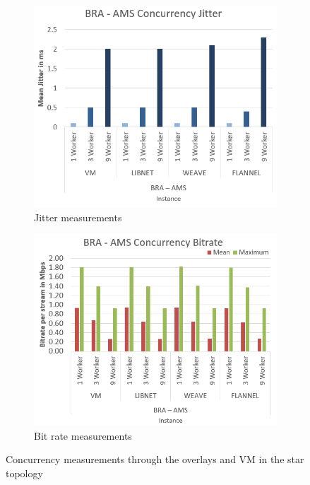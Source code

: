 \begin{figure}[!ht]
\centering
\begin{subfigure}{.5\textwidth}
  \centering
  \includegraphics[scale=0.5]{img/All_Streaming_jitter.PNG}
  \caption{Jitter measurements}
  \label{fig:sub3}
\end{subfigure}%
\begin{subfigure}{.5\textwidth}
  \centering
  \includegraphics[scale=0.5]{img/All_Streaming_TP.PNG}
  \caption{Bit rate measurements}
  \label{fig:sub4}
\end{subfigure}
\caption{Concurrency measurements through the overlays and VM in the star topology}
\label{fig:PtP_All_TCP.PNG}
\end{figure}


